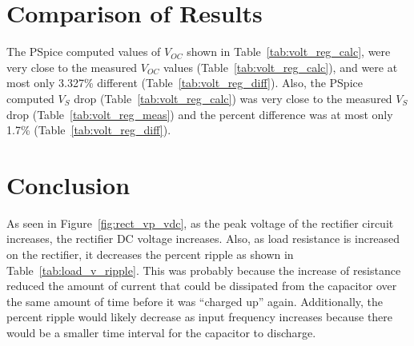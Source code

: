 \documentclass{article}
\begin{document}
\section{Comparison of Results}
\label{sec:comp_of_res}

The PSpice computed values of $V_{OC}$ shown in Table~\ref{tab:volt_reg_calc}, were very close to the measured $V_{OC}$ values (Table~\ref{tab:volt_reg_calc}), and were at most only 3.327\% different (Table~\ref{tab:volt_reg_diff}).  Also, the PSpice computed $V_S$ drop (Table~\ref{tab:volt_reg_calc}) was very close to the measured $V_S$ drop (Table~\ref{tab:volt_reg_meas}) and the percent difference was at most only 1.7\% (Table~\ref{tab:volt_reg_diff}).%

\section{Conclusion}
\label{sec:conclusion}
As seen in Figure~\ref{fig:rect_vp_vdc}, as the peak voltage of the rectifier circuit increases, the rectifier DC voltage increases.  Also, as load resistance is increased on the rectifier, it decreases the percent ripple as shown in Table~\ref{tab:load_v_ripple}.  This was probably because the increase of resistance reduced the amount of current that could be dissipated from the capacitor over the same amount of time before it was “charged up” again.  Additionally, the percent ripple would likely decrease as input frequency increases because there would be a smaller time interval for the capacitor to discharge.
\end{document}
